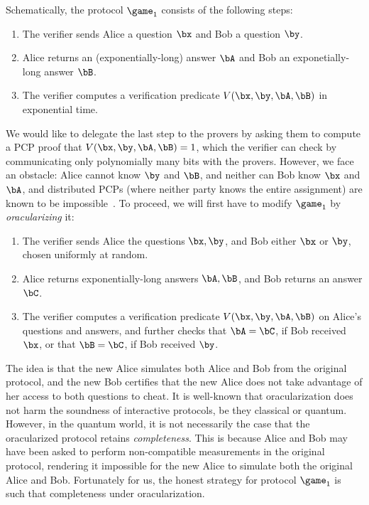 Schematically, the protocol $\game_{1}$ consists of the following
steps:
\begin{enumerate}
  \item The verifier sends Alice a question $\bx$ and Bob a question
    $\by$.
  \item Alice returns an (exponentially-long) answer $\bA$ and Bob an
    exponetially-long answer $\bB$.
  \item The verifier computes a verification predicate $V(\bx, \by,
    \bA, \bB)$ in exponential time.
  \end{enumerate}
  We would like to delegate the last step to the provers by asking
  them to compute a PCP proof that $V(\bx, \by,\bA,\bB) = 1$, which
  the verifier can check by communicating only polynomially many bits
  with the provers. However, we face
  an obstacle: Alice cannot know $\by$ and $\bB$, and neither can Bob
  know $\bx$ and $\bA$, and distributed PCPs (where neither party
  knows the entire assignment) are known to be
  impossible~\cite{ARW17}. To proceed, we will first have to modify
  $\game_{1}$ by \emph{oracularizing} it:
  \begin{enumerate}
    \item The verifier sends Alice the questions $\bx, \by$, and Bob
      either $\bx$ or $\by$, chosen uniformly at random.
    \item Alice returns exponentially-long answers $\bA, \bB$, and
      Bob returns an answer $\bC$.
    \item The verifier computes a verification predicate $V(\bx,
      \by, \bA, \bB)$ on Alice's questions and answers, and further
      checks that $\bA = \bC$, if Bob received $\bx$, or that $\bB =
      \bC$, if Bob received $\by$.
    \end{enumerate}
    The idea is that the new Alice simulates both Alice and Bob from
    the original protocol, and the new Bob certifies that the new
    Alice does not take advantage of her access to both questions to cheat.
    It is well-known that oracularization does not harm the soundness
    of interactive protocols, be they classical or quantum. However,
    in the quantum world, it is not necessarily the case that the
    oracularized protocol retains \emph{completeness}. This is because
    Alice and Bob may have been asked to perform non-compatible
    measurements in the original protocol, rendering it impossible for
    the new Alice to simulate both the original Alice and
    Bob. Fortunately for us, the honest strategy for protocol
    $\game_1$ is such that completeness under oracularization.
    
